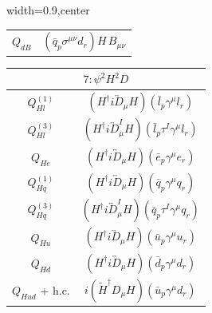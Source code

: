 \begin{table}[H]
\begin{center}
\begin{adjustbox}{width=0.9\textwidth,center}
\begin{minipage}[t]{5.2cm}
\begin{tabular}[t]{c|c}
%
$Q_{dB}$        & $(\bar q_p \sigma^{\mu\nu} d_r) H\, B_{\mu\nu}$ 
\end{tabular}
\end{minipage}
%
%
\begin{minipage}[t]{5.4cm}
\renewcommand{\arraystretch}{1.5}
\begin{tabular}[t]{c|c}
\multicolumn{2}{c}{\boldmath$7:\psi^2H^2 D$} \\
\hline
$Q_{H l}^{(1)}$      & $(H^\dag i\overleftrightarrow{D}_\mu H)(\bar l_p \gamma^\mu l_r)$\\
%
$Q_{H l}^{(3)}$      & $(H^\dag i\overleftrightarrow{D}^I_\mu H)(\bar l_p \tau^I \gamma^\mu l_r)$\\
%
$Q_{H e}$            & $(H^\dag i\overleftrightarrow{D}_\mu H)(\bar e_p \gamma^\mu e_r)$\\
%
$Q_{H q}^{(1)}$      & $(H^\dag i\overleftrightarrow{D}_\mu H)(\bar q_p \gamma^\mu q_r)$\\
%
$Q_{H q}^{(3)}$      & $(H^\dag i\overleftrightarrow{D}^I_\mu H)(\bar q_p \tau^I \gamma^\mu q_r)$\\
%
$Q_{H u}$            & $(H^\dag i\overleftrightarrow{D}_\mu H)(\bar u_p \gamma^\mu u_r)$\\
%
$Q_{H d}$            & $(H^\dag i\overleftrightarrow{D}_\mu H)(\bar d_p \gamma^\mu d_r)$\\
%
$Q_{H u d}$ + h.c.   & $i(\widetilde H ^\dag D_\mu H)(\bar u_p \gamma^\mu d_r)$\\
\end{tabular}
\end{minipage}
%
%
%
\end{adjustbox}
\end{center}


\end{table}
